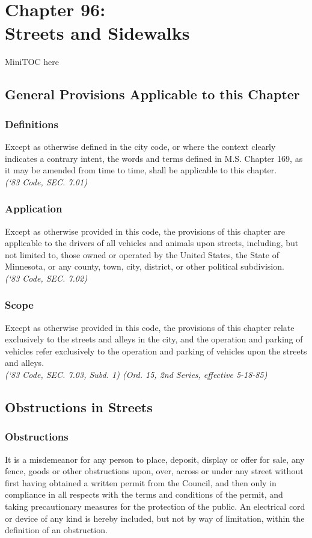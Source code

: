 
%
\chapter*{Chapter 96: \\
	Streets and Sidewalks}

MiniTOC here
\pagebreak
\section{General Provisions Applicable to this Chapter}
\subsection{Definitions}
Except as otherwise defined in the city code, or where the context clearly indicates a contrary intent, the words and terms defined in M.S. Chapter 169, as it may be amended from time to time, shall be applicable to this chapter.\\
\emph{(‘83 Code, SEC. 7.01)}
\subsection{Application}
Except as otherwise provided in this code, the provisions of this chapter are applicable to the drivers of all vehicles and animals upon streets, including, but not limited to, those owned or operated by the United States, the State of Minnesota, or any county, town, city, district, or other political subdivision.\\
\emph{(‘83 Code, SEC. 7.02)}
\subsection{Scope}
Except as otherwise provided in this code, the provisions of this chapter relate exclusively to the streets and alleys in the city, and the operation and parking of vehicles refer exclusively to the operation and parking of vehicles upon the streets and alleys.\\
\emph{(‘83 Code, SEC. 7.03, Subd. 1)  (Ord. 15, 2nd Series, effective 5-18-85)}
\section{Obstructions in Streets}
\subsection{Obstructions}
It is a misdemeanor for any person to place, deposit, display or offer for sale, any fence, goods or other obstructions upon, over, across or under any street without first having obtained a written permit from the Council, and then only in compliance in all respects with the terms and conditions of the permit, and taking precautionary measures for the protection of the public.  An electrical cord or device of any kind is hereby included, but not by way of limitation, within the definition of an obstruction.
